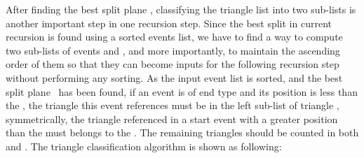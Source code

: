 After finding the best split plane \mybestsplitplane, classifying the triangle list into two sub-lists is another important step in one recursion step. Since the best split in current recursion is found using a sorted events list, we have to find a way to compute two sub-lists of events \myeventlistleft and \myeventlistright, and more importantly, to maintain the ascending order of them so that they can become inputs for the following recursion step without performing any sorting. As the input event list \myeventlist is sorted, and the best split plane \mybestsplitplane\ has been found, if an event is of end type and its position is less than the \mybestsplitplane, the triangle this event references must be in the left sub-list of triangle \mylefttrilist, symmetrically, the triangle referenced in a start event with a greater position than the \mybestsplitplane must belongs to the \myrighttrilist. The remaining triangles should be counted in both \mylefttrilist and \myrighttrilist. The triangle classification algorithm is shown as following: 

